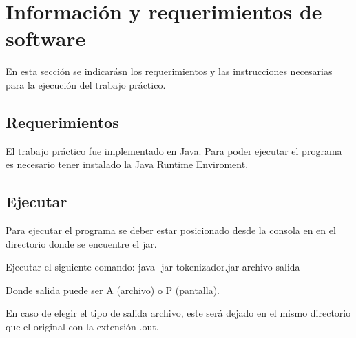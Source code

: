 \section{Informaci\'on y requerimientos de software}

En esta secci\'on se indicar\'asn los requerimientos y las instrucciones necesarias para la ejecuci\'on del trabajo pr\'actico.

\subsection{Requerimientos}

El trabajo pr\'actico fue implementado en Java. Para poder ejecutar el programa es necesario tener instalado la Java Runtime Enviroment. 

\subsection{Ejecutar}

Para ejecutar el programa se deber estar posicionado desde la consola en en el directorio donde se encuentre el jar.

Ejecutar el siguiente comando: java -jar tokenizador.jar archivo salida

Donde salida puede ser A (archivo) o P (pantalla). 

En caso de elegir el tipo de salida archivo, este ser\'a dejado en el mismo directorio que el original con la extensi\'on .out. 